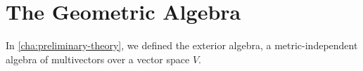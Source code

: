 \chapter{The Geometric Algebra}
\label{cha:geometric-algebra}

In \cref{cha:preliminary-theory}, we defined the exterior algebra, a metric-independent algebra of multivectors over a vector space $V$.